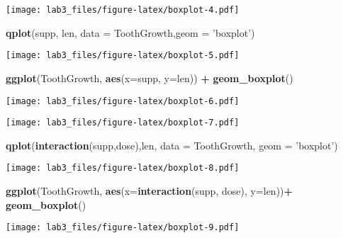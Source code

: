 \documentclass[
]{article}
\newenvironment{Shaded}{\begin{snugshade}}{\end{snugshade}}
\newcommand{\DataTypeTok}[1]{\textcolor[rgb]{0.13,0.29,0.53}{#1}}
\newcommand{\KeywordTok}[1]{\textcolor[rgb]{0.13,0.29,0.53}{\textbf{#1}}}
\newcommand{\NormalTok}[1]{#1}
\newcommand{\OperatorTok}[1]{\textcolor[rgb]{0.81,0.36,0.00}{\textbf{#1}}}
\newcommand{\StringTok}[1]{\textcolor[rgb]{0.31,0.60,0.02}{#1}}
\begin{document}
\texttt{[image: lab3\_files/figure-latex/boxplot-4.pdf]}

\begin{Shaded}
\begin{Highlighting}[]
\KeywordTok{qplot}\NormalTok{(supp, len, }\DataTypeTok{data =}\NormalTok{ ToothGrowth,}\DataTypeTok{geom =} \StringTok{'boxplot'}\NormalTok{)}
\end{Highlighting}
\end{Shaded}

\texttt{[image: lab3\_files/figure-latex/boxplot-5.pdf]}

\begin{Shaded}
\begin{Highlighting}[]
\KeywordTok{ggplot}\NormalTok{(ToothGrowth, }\KeywordTok{aes}\NormalTok{(}\DataTypeTok{x=}\NormalTok{supp, }\DataTypeTok{y=}\NormalTok{len)) }\OperatorTok{+}\StringTok{ }\KeywordTok{geom_boxplot}\NormalTok{()}
\end{Highlighting}
\end{Shaded}

\texttt{[image: lab3\_files/figure-latex/boxplot-6.pdf]}

\begin{Shaded}
\end{Shaded}

\texttt{[image: lab3\_files/figure-latex/boxplot-7.pdf]}

\begin{Shaded}
\begin{Highlighting}[]
\KeywordTok{qplot}\NormalTok{(}\KeywordTok{interaction}\NormalTok{(supp,dose),len, }\DataTypeTok{data =}\NormalTok{ ToothGrowth, }\DataTypeTok{geom =} \StringTok{'boxplot'}\NormalTok{)}
\end{Highlighting}
\end{Shaded}

\texttt{[image: lab3\_files/figure-latex/boxplot-8.pdf]}

\begin{Shaded}
\begin{Highlighting}[]
\KeywordTok{ggplot}\NormalTok{(ToothGrowth, }\KeywordTok{aes}\NormalTok{(}\DataTypeTok{x=}\KeywordTok{interaction}\NormalTok{(supp, dose), }\DataTypeTok{y=}\NormalTok{len))}\OperatorTok{+}\StringTok{ }\KeywordTok{geom_boxplot}\NormalTok{()}
\end{Highlighting}
\end{Shaded}

\texttt{[image: lab3\_files/figure-latex/boxplot-9.pdf]}
\end{document}
